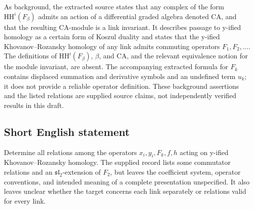 \documentclass[11pt]{article}
\begin{document}
As background, the extracted source states that any complex of the form \(\mathrm{HH}^{i}(F_\beta)\) admits an action of a differential graded algebra denoted \(\mathrm{CA}\), and that the resulting \(\mathrm{CA}\)-module is a link invariant. It describes passage to y-ified homology as a certain form of Koszul duality and states that the y-ified Khovanov--Rozansky homology of any link admits commuting operators \(F_1,F_2,\ldots\). The definitions of \(\mathrm{HH}^{i}(F_\beta)\), \(\beta\), and \(\mathrm{CA}\), and the relevant equivalence notion for the module invariant, are absent. The accompanying extracted formula for \(F_k\) contains displaced summation and derivative symbols and an undefined term \(u_k\); it does not provide a reliable operator definition. These background assertions and the listed relations are supplied source claims, not independently verified results in this draft.
\subsection{Short English statement}
Determine all relations among the operators \(x_i,y_i,F_k,f,h\) acting on y-ified Khovanov--Rozansky homology. The supplied record lists some commutator relations and an \(\mathfrak{sl}_2\)-extension of \(F_2\), but leaves the coefficient system, operator conventions, and intended meaning of a complete presentation unspecified. It also leaves unclear whether the target concerns each link separately or relations valid for every link.
\end{document}
